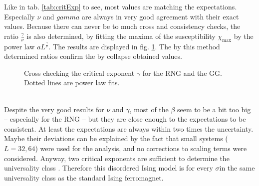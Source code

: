     Like in tab. \ref{tab:critExp} to see, most values
    are matching the expectations. Especially \(\nu\) and \(gamma\)
    are always in very good agreement with their exact values. Because
    there can never be to much cross and consistency checks, the ratio
    \(\frac{\gamma}{\nu}\) is also determined, by fitting the maxima of
    the susceptibility \(\chi_{\mathrm{max}}\) by the power law \(aL^\frac{\gamma}{\nu}\).
    The results are displayed in fig. \ref{fig:susCrossCheck}. The by this
    method determined ratios confirm the by collapse obtained values.
    \begin{figure}[htbp]
        \centering
        \caption[Alternative Way Determining $\gamma$]
        {
            Cross checking the critical exponent $\gamma$ for
                 the RNG and
                 the GG.
            Dotted lines are power law fits.
        }
        \label{fig:susCrossCheck}
    \end{figure}\\
    Despite the very good results for \(\nu\) and \(\gamma\), most of the
    \(\beta\) seem to be a bit too big -- especially for the RNG -- but
    they are close enough to the expectations to be consistent. At least
    the expectations are always within two times the uncertainty.
    Maybe their deviations can be explained by the fact that small
    systems (\(L=32,64\)) were used for the analysis, and no corrections
    to scaling terms were considered.
    Anyway, two critical exponents are sufficient to determine the
    universality class \cite[p. 145]{Katzgraber2011}. Therefore this
    disordered Ising model is for every \(\sigma\)in the same universality
    class as the standard Ising ferromagnet.

